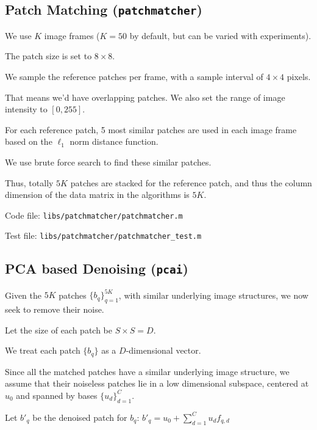 \documentclass[fleqn, 11pt]{article}
\begin{document}
\bigskip

\subsection*{Patch Matching (\texttt{patchmatcher})}

We use $K$ image frames ($K=50$ by default, but can be varied with experiments).

The patch size is set to $8 \times 8$. 

We sample the reference patches per frame, with a sample interval of 
$4 \times 4$ pixels. 

That means we'd have overlapping patches. 
We also set the range of image intensity to $[0, 255]$.

\medskip

For each reference patch, 5 most similar patches are used in each image frame based on the $\ell_1$ norm distance function.

We use brute force search to find these similar patches. 

Thus, totally $5K$ patches are stacked for the reference patch, and thus the column dimension of the data matrix in the algorithms is $5K$.

\medskip

Code file: \texttt{libs/patchmatcher/patchmatcher.m}

Test file: \texttt{libs/patchmatcher/patchmatcher\_test.m}

\bigskip 

\subsection*{PCA based Denoising (\texttt{pcai})}

Given the $5K$ patches $\{b_q\}_{q=1}^{5K}$, with similar underlying
image structures, we now seek to remove their noise. 

\medskip

Let the
size of each patch be $S \times S = D$. 

We treat each patch $\{b_q\}$ as a
$D$-dimensional vector. 

\medskip

Since all the matched patches have a similar underlying image structure, 
we assume that their noiseless patches lie in a low dimensional subspace, 
centered at $u_0$ and spanned by bases $\{u_d\}_{d=1}^C$. 

\medskip

Let $b'_q$ be the denoised patch for $b_q$: $b'_q = u_0 + \sum_{d=1}^C u_d f_{q,d}$
\end{document}
